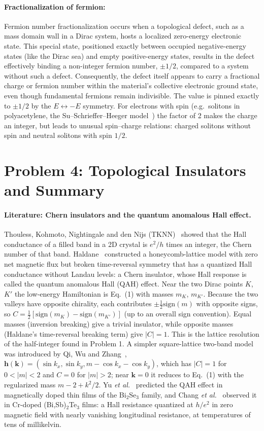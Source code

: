 \documentclass{article}
\begin{document}
    \paragraph{Fractionalization of fermion:}
    Fermion number fractionalization occurs when a topological defect, such as a mass domain wall in a Dirac system, hosts a localized zero-energy electronic state. This special state, positioned exactly between occupied negative-energy states (like the Dirac sea) and empty positive-energy states, results in the defect effectively binding a non-integer fermion number, $\pm 1/2$, compared to a system without such a defect. Consequently, the defect itself appears to carry a fractional charge or fermion number within the material's collective electronic ground state, even though fundamental fermions remain indivisible. The value is pinned exactly to $\pm1/2$ by the $E\leftrightarrow -E$ symmetry. For electrons with spin (e.g.\ solitons in polyacetylene, the Su--Schrieffer--Heeger model~\cite{SSH}) the factor of 2 makes the charge an integer, but leads to unusual spin--charge relations: charged solitons without spin and neutral solitons with spin $1/2$.

    \section{Problem 4: Topological Insulators and Summary}
    \paragraph{Literature: Chern insulators and the quantum anomalous Hall effect.}
    Thouless, Kohmoto, Nightingale and den Nijs (TKNN)~\cite{TKNN} showed that the Hall conductance of a filled band in a 2D crystal is $e^2/h$ times an integer, the Chern number of that band. Haldane~\cite{Haldane} constructed a honeycomb-lattice model with zero net magnetic flux but broken time-reversal symmetry that has a quantized Hall conductance without Landau levels: a Chern insulator, whose Hall response is called the quantum anomalous Hall (QAH) effect. Near the two Dirac points $K$, $K'$ the low-energy Hamiltonian is Eq.~(1) with masses $m_K$, $m_{K'}$. Because the two valleys have opposite chirality, each contributes $\pm\frac{1}{2}\mathrm{sign}(m)$ with opposite signs, so $C = \frac{1}{2}[\mathrm{sign}(m_K) - \mathrm{sign}(m_{K'})]$ (up to an overall sign convention). Equal masses (inversion breaking) give a trivial insulator, while opposite masses (Haldane's time-reversal breaking term) give $|C| = 1$. This is the lattice resolution of the half-integer found in Problem 1. A simpler square-lattice two-band model was introduced by Qi, Wu and Zhang~\cite{QWZ}, $\mathbf{h}(\mathbf{k}) = (\sin k_x, \sin k_y, m - \cos k_x - \cos k_y)$, which has $|C|=1$ for $0<|m|<2$ and $C=0$ for $|m|>2$; near $\mathbf{k}=0$ it reduces to Eq.~(1) with the regularized mass $m - 2 + k^2/2$. Yu \emph{et al.}~\cite{Yu} predicted the QAH effect in magnetically doped thin films of the Bi$_2$Se$_3$ family, and Chang \emph{et al.}~\cite{Chang} observed it in Cr-doped (Bi,Sb)$_2$Te$_3$ films: a Hall resistance quantized at $h/e^2$ in zero magnetic field with nearly vanishing longitudinal resistance, at temperatures of tens of millikelvin.
\end{document}
